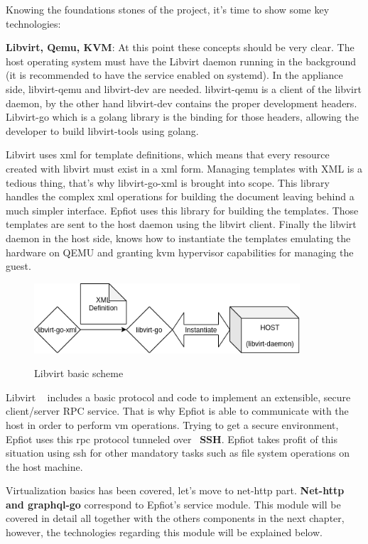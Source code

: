 Knowing the foundations stones of the project, it's time to show some key technologies:

\textbf{Libvirt, Qemu, KVM}: At this point these concepts should be very clear. The host operating system must have the Libvirt daemon running in the background (it is recommended to have the service enabled on systemd). In the appliance side, libvirt-qemu and libvirt-dev are needed. libvirt-qemu is a client of the libvirt daemon, by the other hand libvirt-dev contains the proper development headers. Libvirt-go which is a golang library is the binding for those headers, allowing the developer to build libvirt-tools using golang.

Libvirt uses xml for template definitions, which means that every resource created with libvirt must exist in a xml form. Managing templates with XML is a tedious thing, that's why libvirt-go-xml is brought into scope. This library handles the complex xml operations for building the document leaving behind a much simpler interface. Epfiot uses this library for building the templates. Those templates are sent to the host daemon using the libvirt client. Finally the libvirt daemon in the host side, knows how to instantiate the templates emulating the hardware on QEMU and granting kvm hypervisor capabilities for managing the guest.

\begin{figure}[h!]%
\centering
    \includegraphics[width=3.9in]{figures/libvirt-xml.png}
~\caption{Libvirt basic scheme}
\label{figure3.4}
\end{figure}

Libvirt ~\cite{libvirt_rpc} includes a basic protocol and code to implement an extensible, secure client/server RPC service. That is why Epfiot is able to communicate with the host in order to perform vm operations.
Trying to get a secure environment, Epfiot uses this rpc protocol tunneled over ~\textbf{SSH}. Epfiot takes profit of this situation using ssh for other mandatory tasks such as file system operations on the host machine.

Virtualization basics has been covered, let's move to net-http part.
\textbf{Net-http and graphql-go} correspond to Epfiot's service module. This module will be covered in detail all together with the others components in the next chapter, however, the technologies regarding this module will be explained below.

